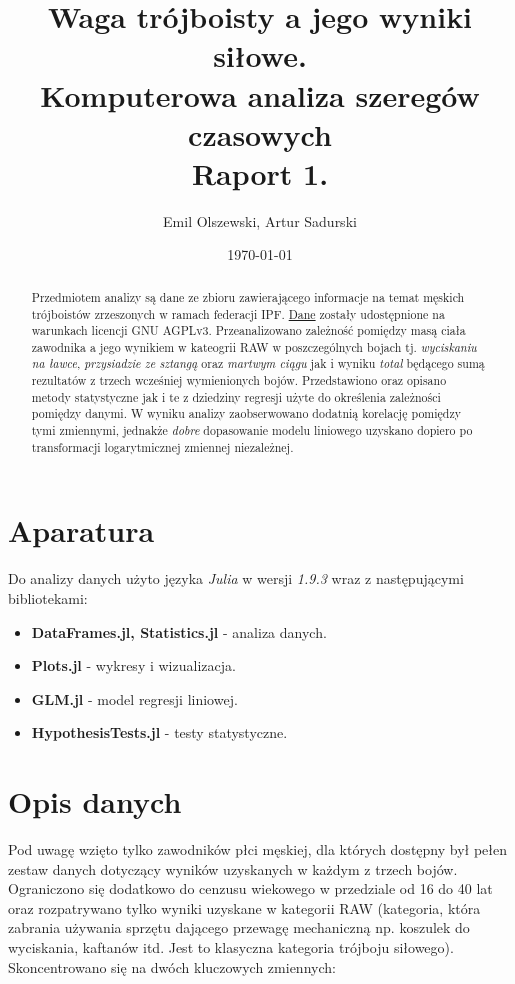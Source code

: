 \documentclass{article}
\author{Emil Olszewski, Artur Sadurski}
\date{\today}
\title{Waga trójboisty a jego wyniki siłowe.\\ \large Komputerowa analiza szeregów czasowych \\ \large Raport 1. }
\begin{document}
\maketitle

\begin{abstract}
Przedmiotem analizy są dane ze zbioru zawierającego informacje na temat 
męskich trójboistów zrzeszonych w ramach federacji IPF. \href{https://gitlab.com/openpowerlifting/opl-data}{Dane} zostały udostępnione na warunkach licencji GNU AGPLv3. 
Przeanalizowano zależność pomiędzy masą ciała zawodnika a jego wynikiem w kateogrii RAW w poszczególnych bojach tj. \textit{wyciskaniu na ławce}, \textit{przysiadzie ze sztangą} oraz \textit{martwym ciągu} jak i wyniku \textit{total} będącego sumą rezultatów z trzech wcześniej wymienionych bojów. Przedstawiono oraz opisano metody statystyczne jak i te z dziedziny regresji użyte do określenia zależności pomiędzy danymi. 
W wyniku analizy zaobserwowano dodatnią korelację pomiędzy tymi zmiennymi, jednakże \textit{dobre} dopasowanie modelu liniowego uzyskano dopiero po transformacji logarytmicznej zmiennej niezależnej.   
\end{abstract}

\section{Aparatura}
Do analizy danych użyto języka \textit{Julia} w wersji \textit{1.9.3} wraz z następującymi bibliotekami:
\begin{itemize}
\item \textbf{DataFrames.jl, Statistics.jl} - analiza danych.
\item \textbf{Plots.jl} - wykresy i wizualizacja. 
\item \textbf{GLM.jl} - model regresji liniowej. 
\item \textbf{HypothesisTests.jl} - testy statystyczne. 
\end{itemize}

\section{Opis danych} 
Pod uwagę wzięto tylko zawodników płci męskiej, dla których dostępny był pełen zestaw danych dotyczący wyników uzyskanych w każdym z trzech bojów. Ograniczono się dodatkowo do cenzusu wiekowego w przedziale od 16 do 40 lat oraz rozpatrywano tylko wyniki uzyskane w kategorii RAW (kategoria, która zabrania używania sprzętu dającego przewagę mechaniczną np. koszulek do wyciskania, kaftanów itd. Jest to klasyczna kategoria trójboju siłowego). \\
Skoncentrowano się na dwóch kluczowych zmiennych:
\end{document}
